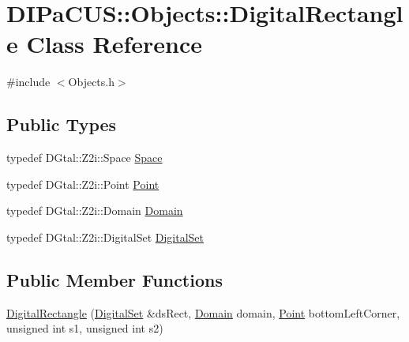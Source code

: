 \hypertarget{classDIPaCUS_1_1Objects_1_1DigitalRectangle}{}\section{D\+I\+Pa\+C\+US\+:\+:Objects\+:\+:Digital\+Rectangle Class Reference}
\label{classDIPaCUS_1_1Objects_1_1DigitalRectangle}


{\ttfamily \#include $<$Objects.\+h$>$}

\subsection*{Public Types}
\begin{DoxyCompactItemize}
\item 
typedef D\+Gtal\+::\+Z2i\+::\+Space \mbox{\hyperlink{classDIPaCUS_1_1Objects_1_1DigitalRectangle_a26a6e7843d9e9c0d7c6ff1e3d999a176}{Space}}
\item 
typedef D\+Gtal\+::\+Z2i\+::\+Point \mbox{\hyperlink{classDIPaCUS_1_1Objects_1_1DigitalRectangle_ac1d9c58863735da9ed1cdf19883ac6bb}{Point}}
\item 
typedef D\+Gtal\+::\+Z2i\+::\+Domain \mbox{\hyperlink{classDIPaCUS_1_1Objects_1_1DigitalRectangle_add1c406f48895527e219cdf6814f6846}{Domain}}
\item 
typedef D\+Gtal\+::\+Z2i\+::\+Digital\+Set \mbox{\hyperlink{classDIPaCUS_1_1Objects_1_1DigitalRectangle_aa277152d51e6e767b4d294dc79b20474}{Digital\+Set}}
\end{DoxyCompactItemize}
\subsection*{Public Member Functions}
\begin{DoxyCompactItemize}
\item 
\mbox{\hyperlink{classDIPaCUS_1_1Objects_1_1DigitalRectangle_a6e2de8d8313dc9d41ac443ebce94767b}{Digital\+Rectangle}} (\mbox{\hyperlink{classDIPaCUS_1_1Objects_1_1DigitalRectangle_aa277152d51e6e767b4d294dc79b20474}{Digital\+Set}} \&ds\+Rect, \mbox{\hyperlink{classDIPaCUS_1_1Objects_1_1DigitalRectangle_add1c406f48895527e219cdf6814f6846}{Domain}} domain, \mbox{\hyperlink{classDIPaCUS_1_1Objects_1_1DigitalRectangle_ac1d9c58863735da9ed1cdf19883ac6bb}{Point}} bottom\+Left\+Corner, unsigned int s1, unsigned int s2)
\end{DoxyCompactItemize}


